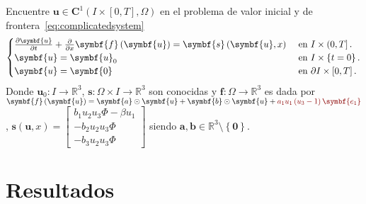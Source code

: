 Encuentre
\begin{math}
	\symbf{u}\in
	\symbf{C}^{1}\left(I\times\left[0,T\right],\Omega\right)
\end{math}
en el problema de valor inicial y de frontera~\eqref{eq:complicatedsystem}
\begin{equation}\label{eq:complicatedsystem}
	\begin{cases}
		\diffp{\symbf{u}}{t}+\diffp{}{x}\symbf{f}\left(\symbf{u}\right)=
		\symbf{s}\left(\symbf{u},x\right) & \text{ en }I\times\left(0,T\right].          \\
		\symbf{u}                                                      =
		\symbf{u}_{0}                     & \text{ en }I\times\left\{t=0\right\}.        \\
		\symbf{u}                                                       =
		\symbf{0}                         & \text{ en }\partial I\times\left[0,T\right].
	\end{cases}
\end{equation}
Donde
\begin{math}
	\symbf{u}_{0}\colon I\to
	\mathbb{R}^{3}
\end{math},
\begin{math}
	\symbf{s}\colon \Omega\times I\to
	\mathbb{R}^{3}
\end{math}
son conocidas y
\begin{math}
	\symbf{f}\colon\Omega\to
	\mathbb{R}^{3}
\end{math}
es dada por
\begin{math}
	\symbf{f}\left(\symbf{u}\right)=
	\symbf{a}\odot\symbf{u}+
	\symbf{b}\odot\symbf{u}+
	\mathcolor{DarkRed}{a_{1}u_{1}\left(u_{3}-1\right)\symbf{e_{1}}}
\end{math},
\begin{math}
	\symbf{s}\left(\symbf{u},x\right)=
	\begin{bmatrix}
		b_{1}u_{2}u_{3}\Phi-\beta u_{1} \\
		-b_{2}u_{2}u_{3}\Phi            \\
		-b_{3}u_{2}u_{3}\Phi
	\end{bmatrix}
\end{math}
siendo $\symbf{a},\symbf{b}\in\mathbb{R}^{3}\setminus\left\{\symbf{0}\right\}$.

\chapter{Resultados}


